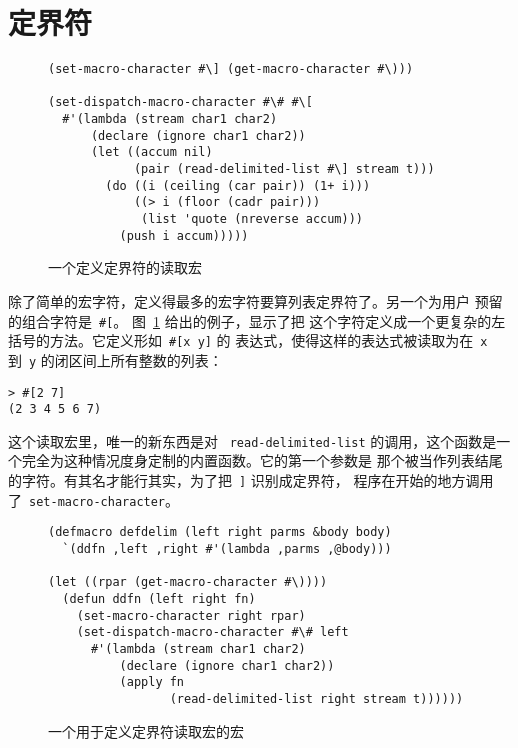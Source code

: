 \section{定界符}
\label{sec:delimiters}

\begin{figure}
\begin{lstlisting}
(set-macro-character #\] (get-macro-character #\)))

(set-dispatch-macro-character #\# #\[
  #'(lambda (stream char1 char2)
      (declare (ignore char1 char2))
      (let ((accum nil)
            (pair (read-delimited-list #\] stream t)))
        (do ((i (ceiling (car pair)) (1+ i)))
            ((> i (floor (cadr pair)))
             (list 'quote (nreverse accum)))
          (push i accum)))))
\end{lstlisting}
  \caption{一个定义定界符的读取宏}
  \label{fig:a_read-macro_defining_delimiters}
\end{figure}

除了简单的宏字符，定义得最多的宏字符要算列表定界符了。另一个为用户
预留的组合字符是~\verb|#[|\index{\#[@\texttt{\#[}}。
图~\ref{fig:a_read-macro_defining_delimiters} 给出的例子，显示了把
这个字符定义成一个更复杂的左括号的方法。它定义形如~\verb|#[x y]| 的
表达式，使得这样的表达式被读取为在~\verb|x| 到~\verb|y| 的闭区间上所有整数的列表：
\begin{lstlisting}
> #[2 7]
(2 3 4 5 6 7)
\end{lstlisting}
这个读取宏里，唯一的新东西是对
~\texttt{read-delimited-list}
的调用，这个函数是一个完全为这种情况度身定制的内置函数。它的第一个参数是
那个被当作列表结尾的字符。有其名才能行其实，为了把~\verb|]| 识别成定界符，
程序在开始的地方调用了~\verb|set-macro-character|。

\begin{figure}
\begin{lstlisting}
(defmacro defdelim (left right parms &body body)
  `(ddfn ,left ,right #'(lambda ,parms ,@body)))

(let ((rpar (get-macro-character #\))))
  (defun ddfn (left right fn)
    (set-macro-character right rpar)
    (set-dispatch-macro-character #\# left
      #'(lambda (stream char1 char2)
          (declare (ignore char1 char2))
          (apply fn
                 (read-delimited-list right stream t))))))
\end{lstlisting}
  \caption{一个用于定义定界符读取宏的宏}
  \label{fig:a_macro_for_defining_delimiter_read-macros}
\end{figure}

